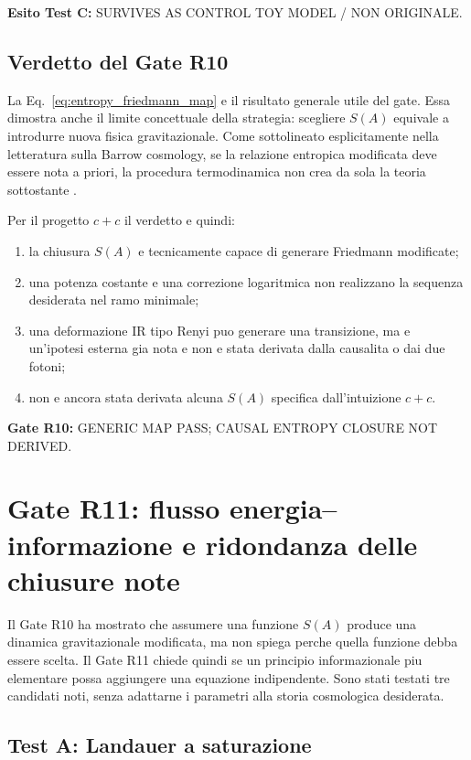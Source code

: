 \documentclass[11pt,a4paper]{article}
\newcommand{\status}[1]{\textsf{#1}}
\begin{document}
\textbf{Esito Test C:} \status{SURVIVES AS CONTROL TOY MODEL / NON ORIGINALE}.

\subsection{Verdetto del Gate R10}

La Eq.~\eqref{eq:entropy_friedmann_map} e il risultato generale utile del gate. Essa dimostra anche il limite concettuale della strategia: scegliere $S(A)$ equivale a introdurre nuova fisica gravitazionale. Come sottolineato esplicitamente nella letteratura sulla Barrow cosmology, se la relazione entropica modificata deve essere nota a priori, la procedura termodinamica non crea da sola la teoria sottostante \cite{Saridakis2020}.

Per il progetto $c+c$ il verdetto e quindi:
\begin{enumerate}
\item la chiusura $S(A)$ e tecnicamente capace di generare Friedmann modificate;
\item una potenza costante e una correzione logaritmica non realizzano la sequenza desiderata nel ramo minimale;
\item una deformazione IR tipo Renyi puo generare una transizione, ma e un'ipotesi esterna gia nota e non e stata derivata dalla causalita o dai due fotoni;
\item non e ancora stata derivata alcuna $S(A)$ specifica dall'intuizione $c+c$.
\end{enumerate}

\textbf{Gate R10:} \status{GENERIC MAP PASS; CAUSAL ENTROPY CLOSURE NOT DERIVED}.


\section{Gate R11: flusso energia--informazione e ridondanza delle chiusure note}
\label{sec:r11_info}

Il Gate R10 ha mostrato che assumere una funzione $S(A)$ produce una dinamica gravitazionale modificata, ma non spiega perche quella funzione debba essere scelta. Il Gate R11 chiede quindi se un principio informazionale piu elementare possa aggiungere una equazione indipendente. Sono stati testati tre candidati noti, senza adattarne i parametri alla storia cosmologica desiderata.

\subsection{Test A: Landauer a saturazione}
\end{document}
